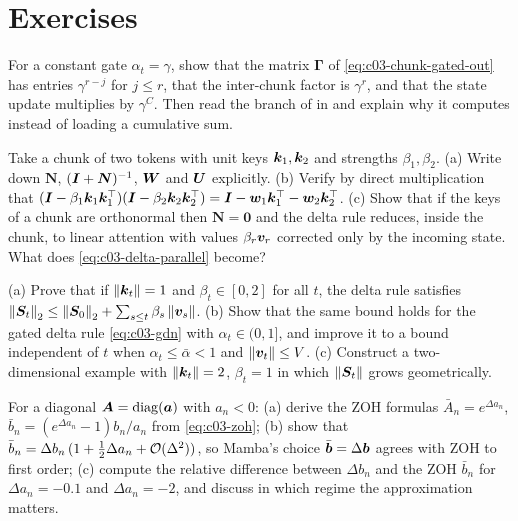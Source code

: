 \section*{Exercises}

\begin{exercise}\label{exe:c03-retnet}
For a constant gate $\alpha_t=\gamma$, show that the matrix $\bm{\Gamma}$ of
\cref{eq:c03-chunk-gated-out} has entries $\gamma^{r-j}$ for $j\le r$, that the inter-chunk
factor is $\gamma^{r}$, and that the state update multiplies by $\gamma^{C}$. Then read the
 branch of  in
 and explain why it
computes  instead of loading a cumulative sum.
\end{exercise}

\begin{exercise}\label{exe:c03-wy}
Take a chunk of two tokens with unit keys $\bm{k}_1,\bm{k}_2$ and strengths $\beta_1,\beta_2$.
(a) Write down $\bm{N}$, $(\bm{I}+\bm{N})^{-1}$, $\bm{W}$ and $\bm{U}$ explicitly.
(b) Verify by direct multiplication that
$(\bm{I}-\beta_1\bm{k}_1\bm{k}_1^{\top})(\bm{I}-\beta_2\bm{k}_2\bm{k}_2^{\top})=\bm{I}-\bm{w}_1\bm{k}_1^{\top}-\bm{w}_2\bm{k}_2^{\top}$.
(c) Show that if the keys of a chunk are orthonormal then $\bm{N}=\bm0$ and the delta rule
reduces, inside the chunk, to linear attention with values $\beta_r\bm{v}_r$ corrected only by the
incoming state. What does \cref{eq:c03-delta-parallel} become?
\end{exercise}

\begin{exercise}\label{exe:c03-stability}
(a) Prove that if $\left\lVert \bm{k}_t\right\rVert=1$ and $\beta_t\in[0,2]$ for all $t$, the delta rule satisfies
$\left\lVert \bm{S}_t\right\rVert_2\le\left\lVert \bm{S}_0\right\rVert_2+\sum_{s\le t}\beta_s\left\lVert \bm{v}_s\right\rVert$.
(b) Show that the same bound holds for the gated delta rule \cref{eq:c03-gdn} with
$\alpha_t\in(0,1]$, and improve it to a bound independent of $t$ when $\alpha_t\le\bar\alpha<1$
and $\left\lVert \bm{v}_t\right\rVert\le V$.
(c) Construct a two-dimensional example with $\left\lVert \bm{k}_t\right\rVert=2$, $\beta_t=1$ in which
$\left\lVert \bm{S}_t\right\rVert$ grows geometrically.
\end{exercise}

\begin{exercise}[Discretization]\label{exe:c03-zoh}
For a diagonal $\bm{A}=\operatorname{diag}(\bm{a})$ with $a_n<0$:
(a) derive the ZOH formulas $\bar A_n=e^{\Delta a_n}$, $\bar b_n=(e^{\Delta a_n}-1)b_n/a_n$ from
\cref{eq:c03-zoh};
(b) show that $\bar b_n=\Delta b_n\,(1+\tfrac12\Delta a_n+\mathcal{O}(\Delta^2))$, so Mamba's choice
$\bar{\bm{b}}=\Delta\bm{b}$ agrees with ZOH to first order;
(c) compute the relative difference between $\Delta b_n$ and the ZOH $\bar b_n$ for
$\Delta a_n=-0.1$ and $\Delta a_n=-2$, and discuss in which regime the approximation matters.
\end{exercise}

